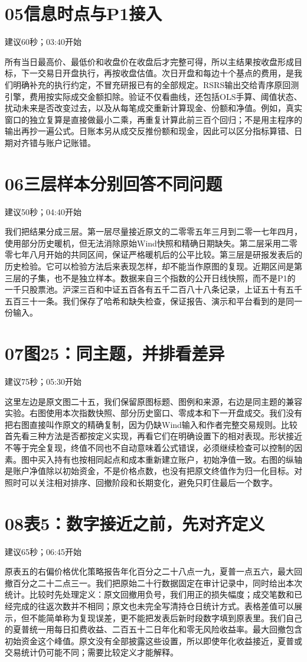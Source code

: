 \documentclass[UTF8,a4paper,11pt]{ctexart}
\begin{document}
\section*{\color{ink}05\quad 信息时点与P1接入}
{\small\color{accent}建议60秒；03:40开始}\par
所有当日最高价、最低价和收盘价在收盘后才完整可得，所以主结果按收盘形成目标，下一交易日开盘执行，再按收盘估值。次日开盘和每边十个基点的费用，是我们明确补充的执行约定，不冒充研报已有的全部规定。RSRS输出交给青序原回测引擎，费用按实际成交金额扣除。验证不仅看曲线，还包括OLS手算、阈值状态、扰动未来是否改变过去，以及从每笔成交重新计算现金、份额和净值。例如，真实窗口的独立复算是直接做最小二乘，再重复计算此前三百个回归；不是用主程序的输出再抄一遍公式。日账本另从成交反推份额和现金，因此可以区分指标算错、日期对齐错与账户记账错。
\section*{\color{ink}06\quad 三层样本分别回答不同问题}
{\small\color{accent}建议50秒；04:40开始}\par
我们把结果分成三层。第一层尽量接近原文的二零零五年三月到二零一七年四月，使用部分历史暖机，但无法消除原始Wind快照和精确日期缺失。第二层采用二零零七年八月开始的共同区间，保证严格暖机后的公平比较。第三层是研报发表后的历史检验。它可以检验方法后来表现怎样，却不能当作原图的复现。近期区间是第三层的子集，也不是独立样本。数据来自三个指数的公开日线快照，而不是P1的一千只股票池。沪深三百和中证五百各有五千二百八十八条记录，上证五十有五千五百三十一条。我们保存了哈希和缺失检查，保证报告、演示和平台看到的是同一份输入。
\newpage
\section*{\color{ink}07\quad 图25：同主题，并排看差异}
{\small\color{accent}建议75秒；05:30开始}\par
这里左边是原文图二十五，我们保留原图标题、图例和来源，右边是同主题的兼容实验。右图使用本次指数快照、部分历史窗口、零成本和下一开盘成交。我们没有把右图直接叫作原文的精确复制，因为仍缺Wind输入和作者完整交易规则。比较首先看三种方法是否都按定义实现，再看它们在明确设置下的相对表现。形状接近不等于完全复现，终值不同也不自动意味着公式错误，必须继续检查可以控制的因素。图中买入持有也按相同起点和成本重新建立账户，初始净值一致。右图的纵轴是账户净值除以初始资金，不是价格点数，也没有把原文终值作为归一化目标。对照时可以关注相对排序、回撤阶段和长期变化，避免只盯住最后一个数字。
\section*{\color{ink}08\quad 表5：数字接近之前，先对齐定义}
{\small\color{accent}建议65秒；06:45开始}\par
原表五的右偏价格优化策略报告年化百分之二十八点一九，夏普一点五六，最大回撤百分之二十二点三一。我们把原始二十行数据固定在审计记录中，同时给出本次统计。比较时先处理定义：原文回撤用负号，我们用正的损失幅度；成交笔数和已经完成的往返次数并不相同；原文也未完全写清持仓日统计方式。表格差值可以展示，但不能简单称为复现误差，更不能把发表后新时段数字填到原表里。我们自己的夏普统一用每日扣费收益、二百五十二日年化和零无风险收益率。最大回撤包含初始资金这个峰值。原文没有全部披露这些设置，所以即使年化收益接近，夏普或交易统计仍可能不同；需要比较定义才能解释。
\newpage
\end{document}

